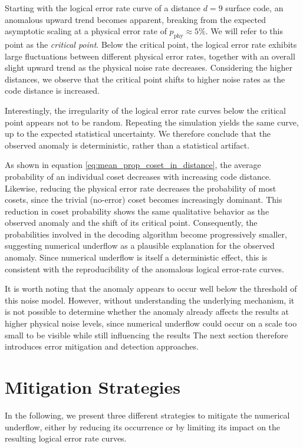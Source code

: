 Starting with the logical error rate curve of a distance $d=9$ surface code, an anomalous upward trend becomes apparent,
breaking from the expected asymptotic scaling at a physical error rate of $p_{\mathrm{phy}} \approx 5\%$. 
We will refer to this point as the \emph{critical point}.
Below the critical point, the logical error rate exhibits large fluctuations between different physical error rates, together with an overall slight upward trend as the physical noise rate decreases.
Considering the higher distances, we observe that the critical point shifts to higher noise rates as the code distance is increased. 

Interestingly, the irregularity of the logical error rate curves below the critical point appears not to be random. 
Repeating the simulation yields the same curve, up to the expected statistical uncertainty. 
We therefore conclude that the observed anomaly is deterministic, rather than a statistical artifact.

As shown in equation \eqref{eq:mean_prop_coset_in_distance}, the average probability of an individual coset decreases with increasing code distance.
Likewise, reducing the physical error rate decreases the probability of most cosets, since the trivial (no-error) coset becomes increasingly dominant. 
This reduction in coset probability shows the same qualitative behavior as the observed anomaly and the shift of its critical point.  
Consequently, the probabilities involved in the decoding algorithm become progressively smaller, suggesting numerical underflow as a plausible explanation for the observed anomaly.
Since numerical underflow is itself a deterministic effect, this is consistent with the reproducibility of the anomalous logical error-rate curves.

It is worth noting that the anomaly appears to occur well below the threshold of this noise model.
However, without understanding the underlying mechanism, it is not possible to determine whether the anomaly already affects the results at higher physical noise levels, 
since numerical underflow could occur on a scale too small to be visible while still influencing the results
The next section therefore introduces error mitigation and detection approaches.

\section{Mitigation Strategies}\label{sec:num_underflow_solutions}

In the following, we present three different strategies to mitigate the numerical underflow, 
either by reducing its occurrence or by limiting its impact on the resulting logical error rate curves.

